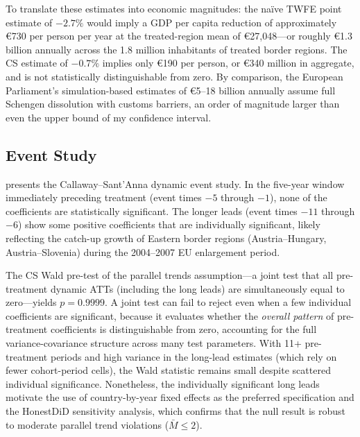 \documentclass[12pt]{article}
\begin{document}
To translate these estimates into economic magnitudes: the na\"ive TWFE point estimate of $-2.7\%$ would imply a GDP per capita reduction of approximately \euro{}730 per person per year at the treated-region mean of \euro{}27,048---or roughly \euro{}1.3 billion annually across the 1.8 million inhabitants of treated border regions. The CS estimate of $-0.7\%$ implies only \euro{}190 per person, or \euro{}340 million in aggregate, and is not statistically distinguishable from zero. By comparison, the European Parliament's simulation-based estimates of \euro{}5--18 billion annually assume full Schengen dissolution with customs barriers, an order of magnitude larger than even the upper bound of my confidence interval.

\subsection{Event Study}

 presents the Callaway--Sant'Anna dynamic event study. In the five-year window immediately preceding treatment (event times $-5$ through $-1$), none of the coefficients are statistically significant. The longer leads (event times $-11$ through $-6$) show some positive coefficients that are individually significant, likely reflecting the catch-up growth of Eastern border regions (Austria--Hungary, Austria--Slovenia) during the 2004--2007 EU enlargement period.

The CS Wald pre-test of the parallel trends assumption---a joint test that all pre-treatment dynamic ATTs (including the long leads) are simultaneously equal to zero---yields $p = 0.9999$. A joint test can fail to reject even when a few individual coefficients are significant, because it evaluates whether the \textit{overall pattern} of pre-treatment coefficients is distinguishable from zero, accounting for the full variance-covariance structure across many test parameters. With 11+ pre-treatment periods and high variance in the long-lead estimates (which rely on fewer cohort-period cells), the Wald statistic remains small despite scattered individual significance. Nonetheless, the individually significant long leads motivate the use of country-by-year fixed effects as the preferred specification and the HonestDiD sensitivity analysis, which confirms that the null result is robust to moderate parallel trend violations ($\bar{M} \leq 2$).
\end{document}
